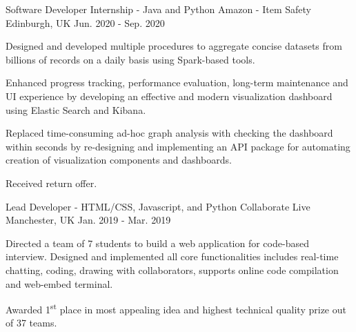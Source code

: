 \begin{cventries}
  \cventry
    {Software Developer Internship - Java and Python} %
    {Amazon - Item Safety} %
    {Edinburgh, UK} %
    {Jun. 2020 - Sep. 2020} %
    {
      \begin{cvitems} %
        \item {Designed and developed multiple procedures to aggregate concise datasets from  billions of records on a daily basis using Spark-based tools.}
        \item{Enhanced progress tracking, performance evaluation, long-term maintenance and UI experience by developing an effective and modern visualization dashboard using Elastic Search and Kibana.}
        \item {Replaced time-consuming ad-hoc graph analysis with checking the dashboard within seconds by re-designing and implementing an API package for automating creation of visualization components and dashboards.}
        \item {Received return offer.}
      \end{cvitems}
    }

  \cventry
    {Lead Developer - HTML/CSS, Javascript, and Python} %
    {Collaborate Live} %
    {Manchester, UK} %
    {Jan. 2019 - Mar. 2019} %
    {
      \begin{cvitems} %
        \item {Directed a team of 7 students to build a web application for code-based interview. Designed and implemented all core functionalities includes real-time chatting, coding, drawing with collaborators, supports online code compilation and web-embed terminal.}
        \item {Awarded 1\textsuperscript{st} place in most appealing idea and highest technical quality prize out of 37 teams.}
      \end{cvitems}
    }
\end{cventries}
